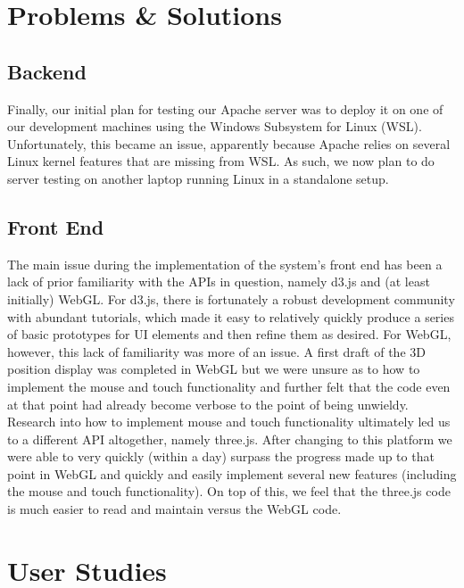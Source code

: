 \documentclass[journal,10pt,onecolumn,compsoc]{IEEEtran}
\begin{document}
\section{Problems \& Solutions}

	\subsection{Backend}
	
		Finally, our initial plan for testing our Apache server	was to deploy it on one of our development machines using the Windows Subsystem for Linux (WSL).
		Unfortunately, this became an issue, apparently because Apache relies on several Linux kernel features that are missing from WSL.
		As such, we now plan to do server testing on another laptop running Linux in a standalone setup.
	
	\subsection{Front End}
		The main issue during the implementation of the system's front end has been a lack of prior familiarity with the APIs in question, namely d3.js and (at least initially) WebGL.
		For d3.js, there is fortunately a robust development community with abundant tutorials, which made it easy to relatively quickly produce a series of basic prototypes for UI elements and then refine them as desired.
		For WebGL, however, this lack of familiarity was more of an issue.
		A first draft of the 3D position display was completed in WebGL but we were unsure as to how to implement the mouse and touch functionality and further felt that the code even at that point had already become verbose to the point of being unwieldy.
		Research into how to implement mouse and touch functionality ultimately led us to a different API altogether, namely three.js.
		After changing to this platform we were able to very quickly (within a day) surpass the progress made up to that point in WebGL and quickly and easily implement several new features (including the mouse and touch functionality).
		On top of this, we feel that the three.js code is much easier to read and maintain versus the WebGL code.	
		
\newpage


\section{User Studies}
\end{document}
